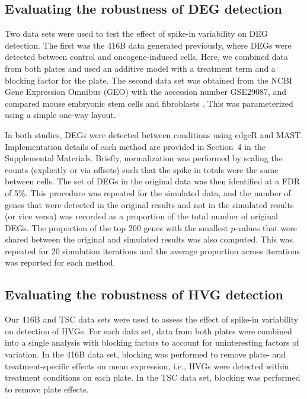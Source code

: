 \documentclass{article}
\newcommand{\suppsecsim}{4}
\begin{document}

\subsection*{Evaluating the robustness of DEG detection}
Two data sets were used to test the effect of spike-in variability on DEG detection.
The first was the 416B data generated previously, where DEGs were detected between control and oncogene-induced cells.
Here, we combined data from both plates and used an additive model with a treatment term and a blocking factor for the plate.
The second data set was obtained from the NCBI Gene Expression Omnibus (GEO) with the accession number GSE29087, and compared mouse embryonic stem cells and fibroblasts \autocite{islam2011characterization}.
This was parameterized using a simple one-way layout.

In both studies, DEGs were detected between conditions using edgeR and MAST.
Implementation details of each method are provided in Section~\suppsecsim{} in the Supplemental Materials. 
Briefly, normalization was performed by scaling the counts (explicitly or via offsets) such that the spike-in totals were the same between cells.
The set of DEGs in the original data was then identified at a FDR of 5\%.
This procedure was repeated for the simulated data, and the number of genes that were detected in the original results and not in the simulated results (or vice versa) was recorded as a proportion of the total number of original DEGs.
The proportion of the top 200 genes with the smallest $p$-values that were shared between the original and simulated results was also computed.
This was repeated for 20 simulation iterations and the average proportion across iterations was reported for each method.

\subsection*{Evaluating the robustness of HVG detection}
Our 416B and TSC data sets were used to assess the effect of spike-in variability on detection of HVGs.
For each data set, data from both plates were combined into a single analysis with blocking factors to account for uninteresting factors of variation.
In the 416B data set, blocking was performed to remove plate- and treatment-specific effects on mean expression, i.e., HVGs were detected within treatment conditions on each plate.
In the TSC data set, blocking was performed to remove plate effects.
\end{document}
